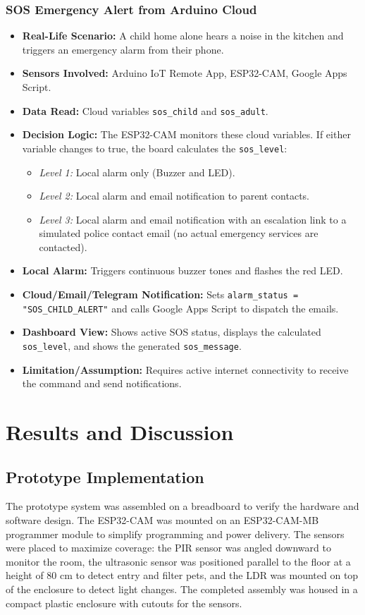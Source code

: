\documentclass[11pt,a4paper]{report}
\begin{document}
\subsection{SOS Emergency Alert from Arduino Cloud}
\begin{itemize}
    \item \textbf{Real-Life Scenario:} A child home alone hears a noise in the kitchen and triggers an emergency alarm from their phone.
    \item \textbf{Sensors Involved:} Arduino IoT Remote App, ESP32-CAM, Google Apps Script.
    \item \textbf{Data Read:} Cloud variables \texttt{sos\_child} and \texttt{sos\_adult}.
    \item \textbf{Decision Logic:} The ESP32-CAM monitors these cloud variables. If either variable changes to true, the board calculates the \texttt{sos\_level}:
    \begin{itemize}
        \item \emph{Level 1:} Local alarm only (Buzzer and LED).
        \item \emph{Level 2:} Local alarm and email notification to parent contacts.
        \item \emph{Level 3:} Local alarm and email notification with an escalation link to a simulated police contact email (no actual emergency services are contacted).
    \end{itemize}
    \item \textbf{Local Alarm:} Triggers continuous buzzer tones and flashes the red LED.
    \item \textbf{Cloud/Email/Telegram Notification:} Sets \texttt{alarm\_status = "SOS\_CHILD\_ALERT"} and calls Google Apps Script to dispatch the emails.
    \item \textbf{Dashboard View:} Shows active SOS status, displays the calculated \texttt{sos\_level}, and shows the generated \texttt{sos\_message}.
    \item \textbf{Limitation/Assumption:} Requires active internet connectivity to receive the command and send notifications.
\end{itemize}
\chapter{Results and Discussion}
\section{Prototype Implementation}
The prototype system was assembled on a breadboard to verify the hardware and software design. The ESP32-CAM was mounted on an ESP32-CAM-MB programmer module to simplify programming and power delivery. The sensors were placed to maximize coverage: the PIR sensor was angled downward to monitor the room, the ultrasonic sensor was positioned parallel to the floor at a height of 80 cm to detect entry and filter pets, and the LDR was mounted on top of the enclosure to detect light changes. The completed assembly was housed in a compact plastic enclosure with cutouts for the sensors.
\end{document}
